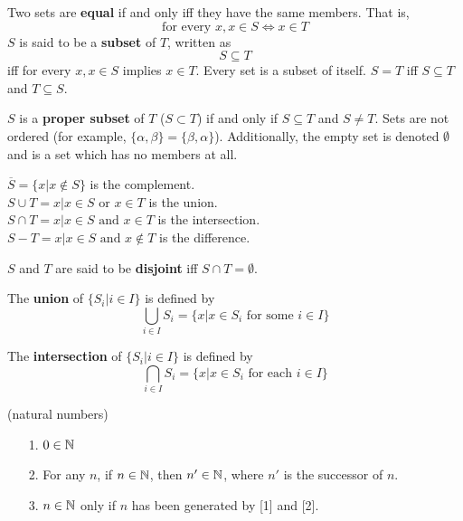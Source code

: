 \documentclass[english, 11pt]{article}
\begin{document}
  Two sets are \textbf{equal} if and only iff they have the same members. That is,
  \[ \mbox{for every } x , x \in S \iff x \in T \]
  $S$ is said to be a \textbf{subset} of $T$, written as
  \[ S \subseteq T \]
  iff for every $x, x \in S$ implies $x \in T$. Every set is a subset of itself. $S = T$ iff $S \subseteq T$ and $T \subseteq S$.

  $S$ is a \textbf{proper subset} of $T$ ($S \subset T$) if and only if $S \subseteq T$ and $S \not = T$. Sets are not ordered (for example, $\{\alpha, \beta\} = \{\beta, \alpha\}$). Additionally, the empty set is denoted $\emptyset$ and is a set which has no members at all.

  \begin{defn}
    $\overline{S} = \{ x \vert x \not \in S \}$ is the complement. \\
    $S \cup T = {x | x \in S \mbox{ or } x  \in T}$ is the union. \\
    $S \cap T = {x | x \in S \mbox{ and } x  \in T}$ is the intersection. \\
    $S - T = {x | x \in S \mbox{ and } x  \not \in T}$ is the difference. \\
  \end{defn}

  $S$ and $T$ are said to be \textbf{disjoint} iff $S \cap T = \emptyset$.

  \begin{defn}[union]
  \label{union}
    The \textbf{union} of $\{S_i | i \in I\}$ is defined by
    \[ \bigcup_{ i \in I} S_i = \{ x | x \in S_i \mbox { for some } i \in I \} \]
  \end{defn}
  \begin{defn}[intersection]
    \label{intersection}
    The \textbf{intersection} of $\{S_i | i \in I\}$  is defined by
    \[ \bigcap_{ i \in I} S_i = \{ x | x \in S_i \mbox { for each } i \in I \} \]
  \end{defn}

  \begin{defn}(natural numbers)
  \label{natural}
    \begin{itemize}
      \item[1.] $0 \in {\mathbb{N}}$
      \item[2.] For any $n$, if $n \in {\mathbb{N}}$, then $n' \in {\mathbb{N}}$, where $n'$ is the successor of $n$.
      \item[3.] $n \in {\mathbb{N}}$ only if $n$ has been generated by [1] and [2].
    \end{itemize}
  \end{defn}
\end{document}
